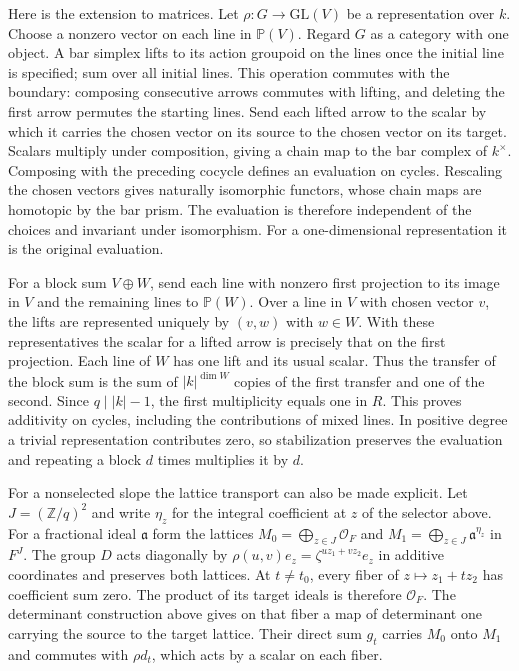 \documentclass[11pt]{amsart}
\theoremstyle{definition}
\theoremstyle{remark}
\begin{document}
Here is the extension to matrices. Let $\rho:G\to\mathrm{GL}(V)$
be a representation over $k$. Choose a nonzero vector on each line
in $\mathbb P(V)$. Regard $G$ as a category with one object. A bar
simplex lifts to its action groupoid on the lines once the initial
line is specified; sum over all initial lines. This operation commutes
with the boundary: composing consecutive arrows commutes with lifting,
and deleting the first arrow permutes the starting lines. Send each
lifted arrow to the scalar by which it carries the chosen vector on
its source to the chosen vector on its target. Scalars multiply under
composition, giving a chain map to the bar complex of $k^\times$.
Composing with the preceding cocycle defines an evaluation on cycles.
Rescaling the chosen vectors gives naturally isomorphic functors,
whose chain maps are homotopic by the bar prism. The evaluation is
therefore independent of the choices and invariant under isomorphism.
For a one-dimensional representation it is the original evaluation.

For a block sum $V\oplus W$, send each line with nonzero first
projection to its image in $V$ and the remaining lines to $\mathbb P(W)$.
Over a line in $V$ with chosen vector $v$, the lifts are represented
uniquely by $(v,w)$ with $w\in W$. With these representatives the
scalar for a lifted arrow is precisely that on the first projection.
Each line of $W$ has one lift and its usual scalar. Thus the transfer
of the block sum is the sum of $|k|^{\dim W}$ copies of the first
transfer and one of the second. Since $q\mid |k|-1$, the first
multiplicity equals one in $R$. This proves additivity on cycles,
including the contributions of mixed lines. In positive degree a
trivial representation contributes zero, so stabilization preserves
the evaluation and repeating a block $d$ times multiplies it by $d$.

For a nonselected slope the lattice transport can also be made
explicit. Let $J=(\mathbb Z/q)^2$ and write $\eta_z$ for the integral
coefficient at $z$ of the selector above. For a fractional ideal
$\mathfrak a$ form the lattices
$M_0=\bigoplus_{z\in J}\mathcal O_F$ and
$M_1=\bigoplus_{z\in J}\mathfrak a^{\eta_z}$ in $F^J$.
The group $D$ acts diagonally by
$\rho(u,v)e_z=\zeta^{uz_1+vz_2}e_z$ in additive coordinates and
preserves both lattices. At $t\ne t_0$, every fiber of
$z\mapsto z_1+t z_2$ has coefficient sum zero. The product of its
target ideals is therefore $\mathcal O_F$. The determinant construction
above gives on that fiber a map of determinant one carrying the source
to the target lattice. Their direct sum $g_t$ carries $M_0$ onto
$M_1$ and commutes with $\rho d_t$, which acts by a scalar on
each fiber.
\end{document}
